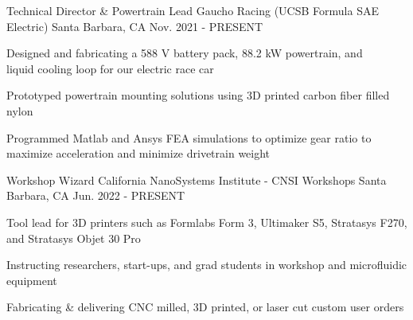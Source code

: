 

\begin{cventries}
\cventry
{Technical Director \& Powertrain Lead} %
{Gaucho Racing (UCSB Formula SAE Electric)} %
{Santa Barbara, CA} %
{Nov. 2021 - PRESENT} %
{ %
\begin{cvitems}   
\item {Designed and fabricating a 588 V battery pack, 88.2 kW powertrain, and \\ liquid cooling loop for our electric race car}
\item {Prototyped powertrain mounting solutions using 3D printed carbon fiber filled nylon}
\item {Programmed Matlab and Ansys FEA simulations to optimize gear ratio to maximize acceleration and minimize drivetrain weight}
\end{cvitems}
}


\cventry
{Workshop Wizard} %
{California NanoSystems Institute - CNSI Workshops} %
{Santa Barbara, CA} %
{Jun. 2022 - PRESENT} %
{ %
\begin{cvitems}
\item {Tool lead for 3D printers such as Formlabs Form 3, Ultimaker S5, Stratasys F270, and Stratasys Objet 30 Pro}
\item {Instructing researchers, start-ups, and grad students in workshop and microfluidic equipment}
\item {Fabricating \& delivering CNC milled, 3D printed, or laser cut custom user orders }
\end{cvitems}
}





\end{cventries}
